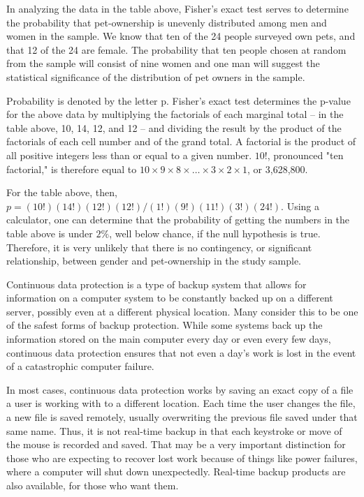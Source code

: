  

In analyzing the data in the table above, Fisher's exact test serves to determine the probability that pet-ownership is unevenly distributed among men and women in the sample. We know that ten of the 24 people surveyed own pets, and that 12 of the 24 are female. The probability that ten people chosen at random from the sample will consist of nine women and one man will suggest the statistical significance of the distribution of pet owners in the sample.

 

Probability is denoted by the letter p. Fisher's exact test determines the p-value for the above data by multiplying the factorials of each marginal total -- in the table above, 10, 14, 12, and 12 -- and dividing the result by the product of the factorials of each cell number and of the grand total. A factorial is the product of all positive integers less than or equal to a given number. $10!$, pronounced "ten factorial," is therefore equal to $10\times 9\times8 \times \ldots\times 3 \times 2 \times 1$, or 3,628,800.

 

For the table above, then, $p= (10!)(14!)(12!)(12!)/(1!)(9!)(11!)(3!)(24!)$. Using a calculator, one can determine that the probability of getting the numbers in the table above is under $2\%$, well below chance, if the null hypothesis is true. Therefore, it is very unlikely that there is no contingency, or significant relationship, between gender and pet-ownership in the study sample.

 



Continuous data protection is a type of backup system that allows for information on a computer system to be constantly backed up on a different server, possibly even at a different physical location. Many consider this to be one of the safest forms of backup protection. While some systems back up the information stored on the main computer every day or even every few days, continuous data protection ensures that not even a day's work is lost in the event of a catastrophic computer failure.

 

In most cases, continuous data protection works by saving an exact copy of a file a user is working with to a different location. Each time the user changes the file, a new file is saved remotely, usually overwriting the previous file saved under that same name. Thus, it is not real-time backup in that each keystroke or move of the mouse is recorded and saved. That may be a very important distinction for those who are expecting to recover lost work because of things like power failures, where a computer will shut down unexpectedly. Real-time backup products are also available, for those who want them.

